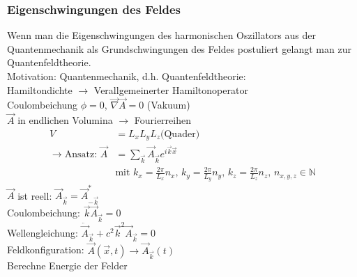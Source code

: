 \documentclass[a4paper]{article}
\begin{document}
\subsubsection{Eigenschwingungen des Feldes}
Wenn man die Eigenschwingungen des harmonischen Oszillators aus der
Quantenmechanik als Grundschwingungen des Feldes postuliert gelangt man zur
Quantenfeldtheorie. \\
Motivation: Quantenmechanik, d.h. Quantenfeldtheorie:\\
Hamiltondichte $\rightarrow$ Verallgemeinerter Hamiltonoperator\\
Coulombeichung $\phi=0$, $\vec{\nabla}\vec{A}=0$ (Vakuum)\\
$\vec{A}$ in endlichen Volumina $\rightarrow$ Fourierreihen\\
\begin{align}
V&=L_xL_yL_z \text{(Quader)}\\
\rightarrow \text{Ansatz: }
\vec{A}&=\sum_{\vec{k}}\vec{A}_{\vec{k}} e^{i \vec{k} \vec{x}}\\
&\text{mit } k_x=\frac{2\pi}{L_x}n_x \text{, } k_y=\frac{2\pi}{L_y}n_y \text{,
 }
k_z=\frac{2\pi}{L_z}n_z \text{, } n_{x,y,z}\in\mathbb{N}
\end{align}
$\vec{A}$ ist reell: $\vec{A}_{\vec{k}}=\vec{A}^*_{-\vec{k}}$\\
Coulombeichung: $\vec{k}\vec{A}_{\vec{k}}=0$\\
Wellengleichung: $\ddot{\vec{A}}_{\vec{k}}+c^2\vec{k}^2\vec{A}_{\vec{k}}=0$\\
Feldkonfiguration: $\vec{A}(\vec{x},t)\longrightarrow\vec{A}_{\vec{k}}(t)$\\
Berechne Energie der Felder
\end{document}
